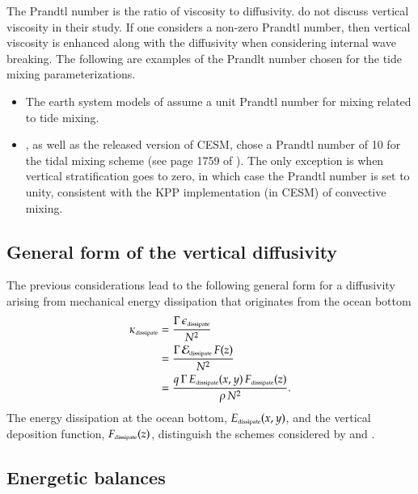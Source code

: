The Prandtl number is the ratio of viscosity to diffusivity.
\cite{Simmonsetal2004} do not discuss vertical viscosity in their
study.  If one considers a non-zero Prandtl number, then vertical
viscosity is enhanced along with the diffusivity when considering
internal wave breaking.  The following are examples of the Prandlt
number chosen for the tide mixing parameterizations.
\begin{itemize}

\item The earth system models of \cite{Dunne_etal_part1_2012} assume a
  unit Prandtl number for mixing related to tide mixing.

\item \cite{Jayne2009}, as well as the released version of CESM, chose
  a Prandtl number of 10 for the tidal mixing scheme (see page 1759 of
  \cite{Jayne2009}).  The only exception is when vertical
  stratification goes to zero, in which case the Prandtl number is set
  to unity, consistent with the KPP implementation (in CESM) of
  convective mixing.

\end{itemize}


\subsection{General form of the vertical diffusivity}
\label{subsection:general-form-tide-diffusivity}

The previous considerations lead to the following general form for a
diffusivity arising from mechanical energy dissipation that originates
from the ocean bottom
\begin{subequations}
\begin{align}
 \kappa_{\mbox{\tiny dissipate}} &= 
 \frac{\Gamma \, \epsilon_{\mbox{\tiny dissipate}}}{N^{2}}
\\
 &=\frac{\Gamma \, {\cal E}_{\mbox{\tiny dissipate}} \, F(z) }{N^{2}}
\\
 &=
 \frac{q \, \Gamma \, E_{\mbox{\tiny dissipate}}(x,y) \,  F_{\mbox{\tiny dissipate}}(z)}  {\rho \, N^2}.
\end{align}
\label{eq:wave-vert-kappa-general-bottom}
\end{subequations}
The energy dissipation at the ocean bottom, $ E_{\mbox{\tiny
    dissipate}}(x,y)$, and the vertical deposition function,
$F_{\mbox{\tiny dissipate}}(z)$, distinguish the schemes considered by
\cite{Simmonsetal2004} and \cite{Melet_etal_2013}.


\subsection{Energetic balances}

